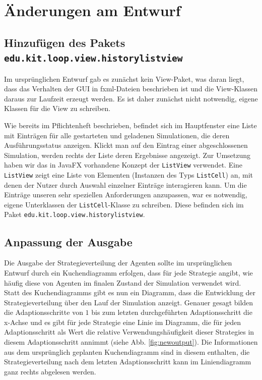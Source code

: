 \documentclass[parskip=full,11pt]{scrartcl}
\begin{document}
\section{Änderungen am Entwurf}

\subsection{Hinzufügen des Pakets \texttt{edu.kit.loop.view.historylistview}}
Im ursprünglichen Entwurf gab es zunächst kein View-Paket, was daran liegt, dass das Verhalten der GUI in fxml-Dateien beschrieben ist und die View-Klassen daraus zur Laufzeit erzeugt werden. Es ist daher zunächst nicht notwendig, eigene Klassen für die View zu schreiben.

Wie bereits im Pflichtenheft beschrieben, befindet sich im Hauptfenster eine Liste mit Einträgen für alle gestarteten und geladenen Simulationen, die deren Ausführungsstatus anzeigen. Klickt man auf den Eintrag einer abgeschlossenen Simulation, werden rechts der Liste deren Ergebnisse angezeigt. Zur Umsetzung haben wir das in JavaFX vorhandene Konzept der \texttt{ListView} verwendet. Eine \texttt{ListView} zeigt eine Liste von Elementen (Instanzen des Typs \texttt{ListCell}) an, mit denen der Nutzer durch Auswahl einzelner Einträge interagieren kann. Um die Einträge unseren sehr speziellen Anforderungen anzupassen, war es notwendig, eigene Unterklassen der \texttt{ListCell}-Klasse zu schreiben. Diese befinden sich im Paket \texttt{edu.kit.loop.view.historylistview}.

\subsection{Anpassung der Ausgabe}\label{outputmod}
Die Ausgabe der Strategieverteilung der Agenten sollte im ursprünglichen Entwurf durch ein Kuchendiagramm erfolgen, dass für jede Strategie angibt, wie häufig diese von Agenten im finalen Zustand der Simulation verwendet wird. Statt des Kuchendiagramms gibt es nun ein Diagramm, dass die Entwicklung der Strategieverteilung über den Lauf der Simulation anzeigt. Genauer gesagt bilden die Adaptionsschritte von \(1\) bis zum letzten durchgeführten Adaptionsschritt die x-Achse und es gibt für jede Strategie eine Linie im Diagramm, die für jeden Adaptionsschritt als Wert die relative Verwendungshäufigkeit dieser Strategies in diesem Adaptionsschritt annimmt (siehe Abb. \ref{fig:newoutput}). Die Informationen aus dem ursprünglich geplanten Kuchendiagramm sind in diesem enthalten, die Strategieverteilung nach dem letzten Adaptionsschritt kann im Liniendiagramm ganz rechts abgelesen werden.
\end{document}
